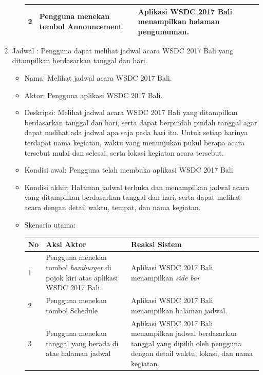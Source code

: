 \begin{enumerate}
\begin{itemize}
\begin{table}[H]
\begin{tabular}{|p{0.5cm}|p{7cm}|p{7cm}|}
				2  & Pengguna menekan tombol Announcement & Aplikasi WSDC 2017 Bali menampilkan halaman pengumuman. \\ \hline
			\end{tabular}
		\end{table}
	\end{itemize}
	\item Jadwal : Pengguna dapat melihat jadwal acara WSDC 2017 Bali yang ditampilkan berdasarkan tanggal dan hari.
	\begin{itemize}
		\item Nama: Melihat jadwal acara WSDC 2017 Bali.
		\item Aktor: Pengguna aplikasi WSDC 2017 Bali.
		\item Deskripsi: Melihat jadwal acara WSDC 2017 Bali yang ditampilkan berdasarkan tanggal dan hari, serta dapat berpindah pindah tanggal agar dapat melihat ada jadwal apa saja pada hari itu. Untuk setiap harinya terdapat nama kegiatan, waktu yang menunjukan pukul berapa acara tersebut mulai dan selesai, serta lokasi kegiatan acara tersebut.
		\item Kondisi awal: Pengguna telah membuka aplikasi WSDC 2017 Bali.
		\item Kondisi akhir: Halaman jadwal terbuka dan menampilkan jadwal acara yang ditampilkan berdasarkan tanggal dan hari, serta dapat melihat acara dengan detail waktu, tempat, dan nama kegiatan.
		\item Skenario utama: \\
		\begin{table}[H]
			\centering
			\begin{tabular}{|p{0.5cm}|p{7cm}|p{7cm}|}
				\hline
				No & Aksi Aktor                               & Reaksi Sistem                                          \\ \hline
				1  & Pengguna menekan tombol {\it hamburger} di pojok kiri atas aplikasi WSDC 2017 Bali. & Aplikasi WSDC 2017 Bali menampilkan {\it side bar} \\ \hline
				2  & Pengguna menekan tombol Schedule & Aplikasi WSDC 2017 Bali menampilkan halaman jadwal. \\ \hline
				3  & Pengguna menekan tanggal yang berada di atas halaman jadwal & Aplikasi WSDC 2017 Bali menampilkan jadwal berdasarkan tanggal yang dipilih oleh pengguna dengan detail waktu, lokasi, dan nama kegiatan. \\ \hline
			\end{tabular}
		\end{table}
	\end{itemize}

\end{enumerate}
